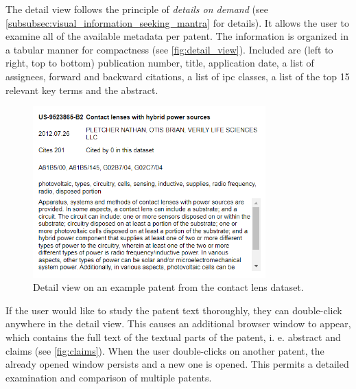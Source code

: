 The detail view follows the principle of \textit{details on demand} (see \autoref{subsubsec:visual_information_seeking_mantra} for details). 
It allows the user to examine all of the available metadata per patent.
The information is organized in a tabular manner for compactness (see \autoref{fig:detail_view}).
Included are (left to right, top to bottom) publication number, title, application date, a list of assignees, forward and backward citations, a list of \gls{ipc} classes,  a list of the top 15 relevant key terms and the abstract.

\begin{figure}[!]
\centering
\includegraphics[width=0.8\textwidth]{img/detail_view}
\caption{Detail view on an example patent from the contact lens dataset.}
\label{fig:detail_view}
\end{figure}

If the user would like to study the patent text thoroughly, they can double-click anywhere in the detail view.
This causes an additional browser window to appear, which contains the full text of the textual parts of the patent, i. e. abstract and claims (see \autoref{fig:claims}).
When the user double-clicks on another patent, the already opened window persists and a new one is opened.
This permits a detailed examination and comparison of multiple patents.

